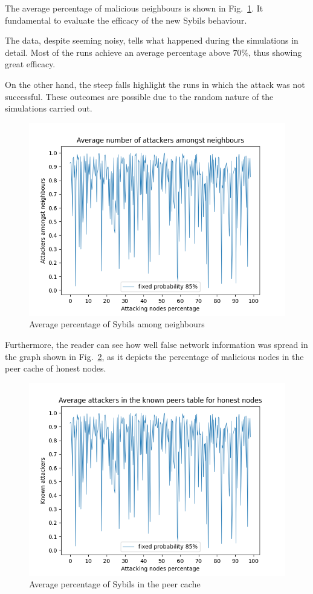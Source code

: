 \documentclass[12pt, letterpaper, twoside]{article}
\begin{document}
The average percentage of malicious neighbours is shown in Fig.~\ref{fig:avgatk}. It fundamental to evaluate the efficacy of the new Sybils behaviour.

The data, despite seeming noisy, tells what happened during the simulations in detail. Most of the runs achieve an average percentage above $70\%$, thus showing great efficacy. 

On the other hand, the steep falls highlight the runs in which the attack was not successful. These outcomes are possible due to the random nature of the simulations carried out.\\

\begin{figure}[h!]
	\includegraphics[width=.7\textwidth]{pict/results/in-hon-avg-neigh-atk.png}
	\centering
	\caption{Average percentage of Sybils among neighbours}
	\label{fig:avgatk}
\end{figure}

Furthermore, the reader can see how well false network information was spread in the graph shown in Fig.~\ref{fig:avgatk-known}, as it depicts the percentage of malicious nodes in the peer cache of honest nodes.\\

\begin{figure}[h!]
	\includegraphics[width=.7\textwidth]{pict/results/in-hon-avg-known-atk.png}
	\centering
	\caption{Average percentage of Sybils in the peer cache}
	\label{fig:avgatk-known}
\end{figure}
\end{document}

